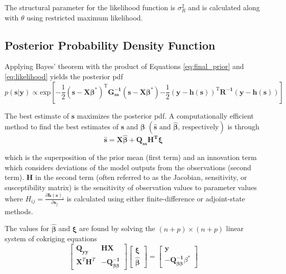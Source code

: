 \documentclass[11pt,oneside,onecolumn]{usgsreport}
\begin{document}
\begin{appendix}
The structural parameter for the likelihood function is $\sigma_{R}^{2}$
and is calculated along with $\theta$ using restricted maximum likelihood.


\subsection{Posterior Probability Density Function}

Applying Bayes' theorem with the product of Equations \ref{eq:final_prior}
and \ref{eq:likelihood} yields the posterior pdf
\begin{equation}
p(\mathbf{s|y})\propto\mathrm{exp\left[\mathbf{-}\frac{1}{2}(\mathbf{s-X\beta}^{*})^{T}\mathbf{G_{\mathbf{ss}}^{-1}}(\mathbf{s-X\beta^{*}})\mathbf{-}\frac{1}{2}\left(\mathbf{y-h}(\mathbf{s})\right)^{T}\mathbf{R^{-1}\left(\mathbf{y-h}(\mathbf{s})\right)}\right]}\label{eq:posterior}
\end{equation}


The best estimate of $\mathbf{s}$ maximizes the posterior pdf. A
computationally efficient method to find the best estimates of $\mathbf{s}$
and $\mathbf{\beta}$ $\left(\hat{\mathbf{s}}\mbox{ and }\mathbf{\hat{\beta}}\mbox{, respectively}\right)$
is through
\begin{equation}
\hat{\mathbf{s}}=\mathbf{X\hat{\beta}+Q_{ss}H^{\mathbf{T}}\xi}\label{eq:shat}
\end{equation}


which is the superposition of the prior mean (first term) and an innovation
term which considers deviations of the model outputs from the observations
(second term). $\mathbf{H}$ in the second term (often referred to
as the Jacobian, sensitivity, or susceptibility matrix) is the sensitivity
of observation values to parameter values $\mbox{where }H_{ij}=\frac{\partial\mathbf{h}\left(\mathbf{s}\right)_{i}}{\partial\mathbf{s}_{j}}$
is calculated using either finite-difference or adjoint-state methods.

The values for $\mathbf{\hat{\beta}}$ and $\mathbf{\xi}$ are found
by solving the $(n+p)\times(n+p)$ linear system of cokriging equations
\begin{equation}
\left[\begin{array}{cc}
\mathbf{Q_{yy}} & \mathbf{HX}\\
\mathbf{X}^{T}\mathbf{H}^{T} & \mathbf{-}\mathbf{Q_{\beta\beta}^{-1}}
\end{array}\right]\left[\begin{array}{c}
\mathbf{\xi}\\
\mathbf{\hat{\beta}}
\end{array}\right]=\left[\begin{array}{c}
\mathbf{y}\\
\mathbf{-}\mathbf{Q_{\beta\beta}^{-1}}\beta^{*}
\end{array}\right]\label{eq:cokriging}
\end{equation}



\end{appendix}
\end{document}
